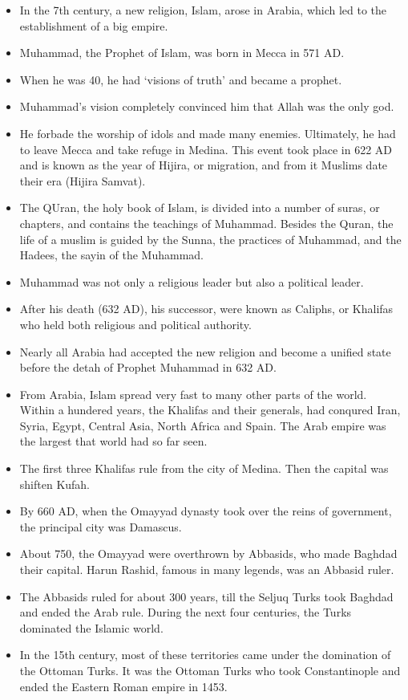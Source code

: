\documentclass[
  openany]{book}
\providecommand{\tightlist}{%
  \setlength{\itemsep}{0pt}\setlength{\parskip}{0pt}}
\begin{document}
\begin{itemize}
\tightlist
\item
  In the 7th century, a new religion, Islam, arose in Arabia, which led to the establishment of a big empire.
\item
  Muhammad, the Prophet of Islam, was born in Mecca in 571 AD.
\item
  When he was 40, he had `visions of truth' and became a prophet.
\item
  Muhammad's vision completely convinced him that Allah was the only god.
\item
  He forbade the worship of idols and made many enemies. Ultimately, he had to leave Mecca and take refuge in Medina. This event took place in 622 AD and is known as the year of Hijira, or migration, and from it Muslims date their era (Hijira Samvat).
\item
  The QUran, the holy book of Islam, is divided into a number of suras, or chapters, and contains the teachings of Muhammad. Besides the Quran, the life of a muslim is guided by the Sunna, the practices of Muhammad, and the Hadees, the sayin of the Muhammad.
\item
  Muhammad was not only a religious leader but also a political leader.
\item
  After his death (632 AD), his successor, were known as Caliphs, or Khalifas who held both religious and political authority.
\item
  Nearly all Arabia had accepted the new religion and become a unified state before the detah of Prophet Muhammad in 632 AD.
\item
  From Arabia, Islam spread very fast to many other parts of the world. Within a hundered years, the Khalifas and their generals, had conqured Iran, Syria, Egypt, Central Asia, North Africa and Spain. The Arab empire was the largest that world had so far seen.
\item
  The first three Khalifas rule from the city of Medina. Then the capital was shiften Kufah.
\item
  By 660 AD, when the Omayyad dynasty took over the reins of government, the principal city was Damascus.
\item
  About 750, the Omayyad were overthrown by Abbasids, who made Baghdad their capital. Harun Rashid, famous in many legends, was an Abbasid ruler.
\item
  The Abbasids ruled for about 300 years, till the Seljuq Turks took Baghdad and ended the Arab rule. During the next four centuries, the Turks dominated the Islamic world.
\item
  In the 15th century, most of these territories came under the domination of the Ottoman Turks. It was the Ottoman Turks who took Constantinople and ended the Eastern Roman empire in 1453.
\end{itemize}
\end{document}
